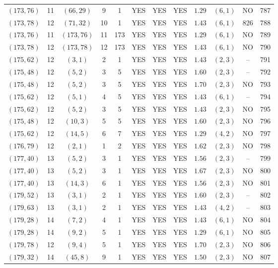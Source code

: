 \begin{longtable}{|c|c|c|c|c|c|c|c|c|c|c|c|}
$(173,76)$ & 11 & $(66,29)$ & 9 & 1 & YES & YES & YES & $1.29$ & $(6,1)$ & NO & 787\\
$(173,78)$ & 12 & $(71,32)$ & 10 & 1 & YES & YES & YES & $1.43$ & $(6,1)$ & 826 & 788\\
$(173,76)$ & 11 & $(173,76)$ & 11 & 173 & YES & YES & YES & $1.29$ & $(6,1)$ & NO & 789\\
$(173,78)$ & 12 & $(173,78)$ & 12 & 173 & YES & YES & YES & $1.43$ & $(6,1)$ & NO & 790\\
$(175,62)$ & 12 & $(3,1)$ & 2 & 1 & YES & YES & YES & $1.43$ & $(2,3)$ & -- & 791\\
$(175,48)$ & 12 & $(5,2)$ & 3 & 5 & YES & YES & YES & $1.60$ & $(2,3)$ & -- & 792\\
$(175,48)$ & 12 & $(5,2)$ & 3 & 5 & YES & YES & YES & $1.70$ & $(2,3)$ & NO & 793\\
$(175,62)$ & 12 & $(5,1)$ & 4 & 5 & YES & YES & YES & $1.43$ & $(6,1)$ & -- & 794\\
$(175,62)$ & 12 & $(5,2)$ & 3 & 5 & YES & YES & YES & $1.43$ & $(2,3)$ & NO & 795\\
$(175,48)$ & 12 & $(10,3)$ & 5 & 5 & YES & YES & YES & $1.60$ & $(2,3)$ & NO & 796\\
$(175,62)$ & 12 & $(14,5)$ & 6 & 7 & YES & YES & YES & $1.29$ & $(4,2)$ & NO & 797\\
$(176,79)$ & 12 & $(2,1)$ & 1 & 2 & YES & YES & YES & $1.62$ & $(2,3)$ & NO & 798\\
$(177,40)$ & 13 & $(5,2)$ & 3 & 1 & YES & YES & YES & $1.56$ & $(2,3)$ & -- & 799\\
$(177,40)$ & 13 & $(5,2)$ & 3 & 1 & YES & YES & YES & $1.67$ & $(2,3)$ & NO & 800\\
$(177,40)$ & 13 & $(14,3)$ & 6 & 1 & YES & YES & YES & $1.56$ & $(2,3)$ & NO & 801\\
$(179,52)$ & 13 & $(3,1)$ & 2 & 1 & YES & YES & YES & $1.60$ & $(2,3)$ & -- & 802\\
$(179,63)$ & 13 & $(3,1)$ & 2 & 1 & YES & YES & YES & $1.43$ & $(4,2)$ & -- & 803\\
$(179,28)$ & 14 & $(7,2)$ & 4 & 1 & YES & YES & YES & $1.43$ & $(6,1)$ & NO & 804\\
$(179,28)$ & 14 & $(9,2)$ & 5 & 1 & YES & YES & YES & $1.29$ & $(6,1)$ & NO & 805\\
$(179,78)$ & 12 & $(9,4)$ & 5 & 1 & YES & YES & YES & $1.70$ & $(2,3)$ & NO & 806\\
$(179,32)$ & 14 & $(45,8)$ & 9 & 1 & YES & YES & YES & $1.50$ & $(2,3)$ & NO & 807\\

\end{longtable}
